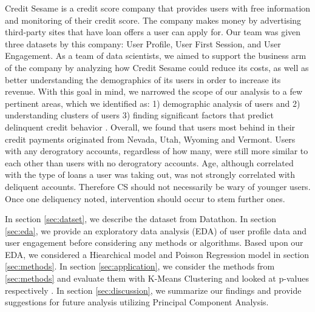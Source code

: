 \documentclass[11pt]{llncs}
\begin{document}
Credit Sesame is a credit score company that provides users with free information and monitoring of their credit score. The company makes money by advertising third-party sites that have loan offers a user can apply for. Our team was given three datasets by this company: User Profile, User First Session, and User Engagement. As a team of data scientists, we aimed to support the business arm of the company by analyzing how Credit Sesame could reduce its costs, as well as better understanding the demographics of its users in order to increase its revenue. With this goal in mind, we narrowed the scope of our analysis to a few pertinent areas, which we identified as: 1) demographic analysis of users and 2) understanding clusters of users 3) finding significant factors that predict delinquent credit behavior . Overall, we found that users most behind in their credit payments originated from Nevada, Utah, Wyoming and Vermont. Users with any derogratory accounts, regardless of how many, were still more similar to each other than users with no derogratory accounts. Age, although correlated with the type of loans a user was taking out, was not strongly correlated with deliquent accounts. Therefore CS should not necessarily be wary of younger users. Once one deliquency noted, intervention should occur to stem further ones.

In section \ref{sec:datset}, we describe the dataset from Datathon. In section \ref{sec:eda}, we provide an exploratory data analysis (EDA) of user profile data and user engagement before considering any methods or algorithms. Based upon our EDA, we considered a Hiearchical model and Poisson Regression model in section \ref{sec:methods}. In section \ref{sec:application}, we consider the methods from \ref{sec:methods} and evaluate them with K-Means Clustering and looked at p-values respectively . In section \ref{sec:discussion}, we summarize our findings and provide suggestions for future analysis utilizing Principal Component Analysis.
\end{document}
